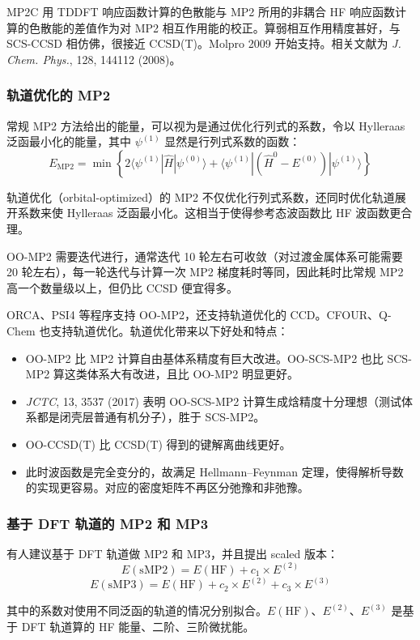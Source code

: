 MP2C 用 TDDFT 响应函数计算的色散能与 MP2 所用的非耦合 HF 响应函数计算的色散能的差值作为对 MP2 相互作用能的校正。算弱相互作用精度甚好，与 SCS-CCSD 相仿佛，很接近 CCSD(T)。Molpro 2009 开始支持。相关文献为 \textit{J. Chem. Phys.}, 128, 144112 (2008)。

\subsubsection*{轨道优化的 MP2}

常规 MP2 方法给出的能量，可以视为是通过优化行列式的系数，令以 Hylleraas 泛函最小化的能量，其中 $\psi^{(1)}$ 显然是行列式系数的函数：
\[
E_{\mathrm{MP2}}
=
\min\left\{
2\langle \psi^{(1)}|\hat H|\psi^{(0)}\rangle
+
\langle \psi^{(1)}|(\hat H^0-E^{(0)})|\psi^{(1)}\rangle
\right\}
\]

轨道优化（orbital-optimized）的 MP2 不仅优化行列式系数，还同时优化轨道展开系数来使 Hylleraas 泛函最小化。这相当于使得参考态波函数比 HF 波函数更合理。

OO-MP2 需要迭代进行，通常迭代 10 轮左右可收敛（对过渡金属体系可能需要 20 轮左右），每一轮迭代与计算一次 MP2 梯度耗时等同，因此耗时比常规 MP2 高一个数量级以上，但仍比 CCSD 便宜得多。

ORCA、PSI4 等程序支持 OO-MP2，还支持轨道优化的 CCD。CFOUR、Q-Chem 也支持轨道优化。轨道优化带来以下好处和特点：
\begin{itemize}
  \item OO-MP2 比 MP2 计算自由基体系精度有巨大改进。OO-SCS-MP2 也比 SCS-MP2 算这类体系大有改进，且比 OO-MP2 明显更好。
  \item \textit{JCTC}, 13, 3537 (2017) 表明 OO-SCS-MP2 计算生成焓精度十分理想（测试体系都是闭壳层普通有机分子），胜于 SCS-MP2。
  \item OO-CCSD(T) 比 CCSD(T) 得到的键解离曲线更好。
  \item 此时波函数是完全变分的，故满足 Hellmann--Feynman 定理，使得解析导数的实现更容易。对应的密度矩阵不再区分弛豫和非弛豫。
\end{itemize}

\subsubsection*{基于 DFT 轨道的 MP2 和 MP3}

有人建议基于 DFT 轨道做 MP2 和 MP3，并且提出 scaled 版本：
\[
E(\mathrm{sMP2})=E(\mathrm{HF})+c_1\times E^{(2)}
\]
\[
E(\mathrm{sMP3})=E(\mathrm{HF})+c_2\times E^{(2)}+c_3\times E^{(3)}
\]

其中的系数对使用不同泛函的轨道的情况分别拟合。$E(\mathrm{HF})$、$E^{(2)}$、$E^{(3)}$ 是基于 DFT 轨道算的 HF 能量、二阶、三阶微扰能。

